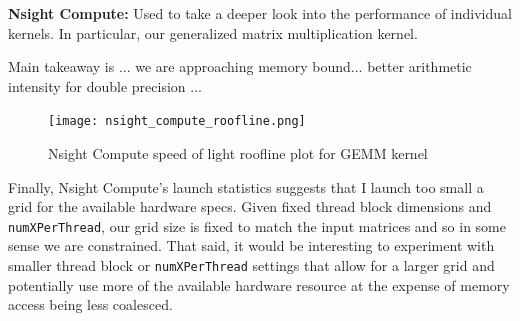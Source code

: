 \documentclass[12pt,letterpaper,twoside]{article}
\begin{document}
\textbf{Nsight Compute:} Used to take a deeper look into the performance of 
individual kernels. In particular, our generalized matrix multiplication kernel.

Main takeaway is  ...  we are approaching memory bound... better arithmetic intensity 
for double precision ...

\begin{figure}[!htbp]
    \centering
    \texttt{[image: nsight\_compute\_roofline.png]}
    \caption{Nsight Compute speed of light roofline plot for GEMM kernel}
\end{figure}

Finally, Nsight Compute's launch statistics suggests that I launch too small a grid for the 
available hardware specs. Given fixed thread block dimensions and \texttt{numXPerThread}, 
our grid size is fixed to match the input matrices and so in some sense we are constrained. That 
said, it would be interesting to experiment with smaller thread block or \texttt{numXPerThread} 
settings that allow for a larger grid and potentially use more of the available hardware 
resource at the expense of memory access being less coalesced. 
\end{document}
